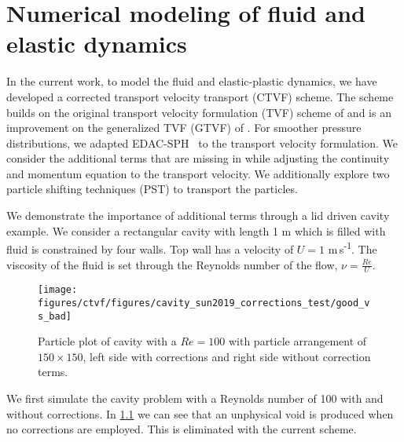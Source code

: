 \chapter{Numerical modeling of fluid and elastic dynamics}
\label{chap:ctvf}

In the current work, to model the fluid and elastic-plastic dynamics, we have
developed a corrected transport velocity transport (CTVF) scheme. The scheme
builds on the original transport velocity formulation (TVF) scheme of
\textcite{Adami2013} and is an improvement on the generalized TVF (GTVF) of
\textcite{zhang2017generalized}. For smoother pressure distributions, we adapted
EDAC-SPH~\parencite{edac-sph:cf:2019} to the transport velocity formulation. We
consider the additional terms that are missing in \parencite{Adami2013} while
adjusting the continuity and momentum equation to the transport velocity. We
additionally explore two particle shifting techniques (PST) to transport the
particles.

We demonstrate the importance of additional terms through a lid driven cavity
example. We consider a rectangular cavity with length 1 m which is filled with
fluid is constrained by four walls. Top wall has a velocity of $U = 1 $
m\,s\textsuperscript{-1}. The viscosity of the fluid is set through the Reynolds
number of the flow, $\nu = \frac{Re}{U}$.
%
\begin{figure}
  \centering
  \texttt{[image: figures/ctvf/figures/cavity\_sun2019\_corrections\_test/good\_vs\_bad]}
  \caption{ Particle plot of cavity with a $Re=100$ with particle arrangement
    of $150 \times 150$, left side with corrections and right side without
    correction terms.}%
  \label{fig:ldc:particle_plots_re100_compare}
\end{figure}
%
We first simulate the cavity problem with a Reynolds number of 100 with and
without corrections. In \cref{fig:ldc:particle_plots_re100_compare} we can see
that an unphysical void is produced when no corrections are employed. This is
eliminated with the current scheme.


